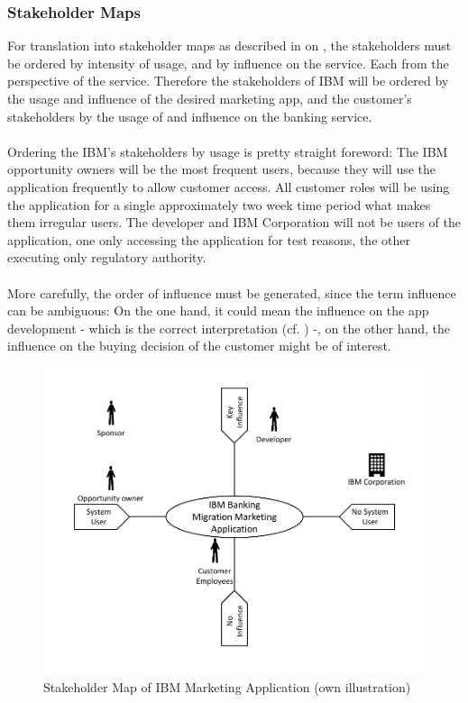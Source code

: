 \subsubsection{Stakeholder Maps}
For translation into stakeholder maps as described in \Cref{} on \cpageref{}, the stakeholders must be ordered by intensity of usage, and by influence on the service. Each from the perspective of the service. Therefore the stakeholders of IBM will be ordered by the usage and influence of the desired marketing app, and the customer's stakeholders by the usage of and influence on the banking service.

\paragraph{}
Ordering the IBM's stakeholders by usage is pretty straight foreword: The IBM opportunity owners will be the most frequent users, because they will use the application frequently to allow customer access. All customer roles will be using the application for a single approximately two week time period what makes them irregular users.
The developer and IBM Corporation will not be users of the application, one only accessing the application for test reasons, the other executing only regulatory authority. 

\paragraph{} More carefully, the order of influence must be generated, since the term influence can be ambiguous: On the one hand, it could mean the influence on the app development - which is the correct interpretation (cf. \Cref{}) -, on the other hand, the influence on the buying decision of the customer might be of interest.


\begin{figure}[H]
    \centering
    \includegraphics[height=.5\textheight]{img/smMarketingApp.pdf}
    \caption[Stakeholder Map of IBM Marketing Application]{Stakeholder Map of IBM Marketing Application (own illustration)}
    \label{fig:smIBM}
\end{figure}

